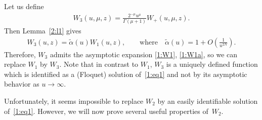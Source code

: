\documentclass[11pt]{article}
\numberwithin{equation}{section}
\begin{document}
Let us def\/ine
\begin{gather*}%
W_3(u,\mu,z)= \frac{2^{-\mu}u^\mu}{\Gamma(\mu+1)}W_+(u,\mu,z) .
\end{gather*}
Then Lemma~\ref{2:l1} gives
\begin{gather*}%
 W_3(u,z)=\tilde\alpha(u) W_1(u,z),\qquad \text{where} \quad \tilde\alpha(u)=1+O\left(\frac1{u^{2N}}\right).
\end{gather*}
Therefore, $W_3$ admits the asymptotic expansion \eqref{1:W1}, \eqref{1:W1a}, so we can replace $W_1$ by $W_3$.
Note that in contrast to $W_1$, $W_3$ is a uniquely def\/ined function which is identif\/ied as a (Floquet) solution of~\eqref{1:eq1} and not by its asymptotic behavior as $u\to\infty$.

Unfortunately, it seems impossible to replace $W_2$ by an easily identif\/iable solution of~\eqref{1:eq1}. However, we will now prove several useful properties of~$W_2$.
\end{document}
